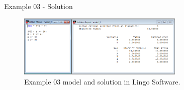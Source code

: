 \begin{frame}{Example 03 - Solution}
\begin{figure}
    \includegraphics[width=300px]{slides/ex03/screenshot.png}
    \caption{Example 03 model and solution in Lingo Software.}
\end{figure}
\end{frame}
